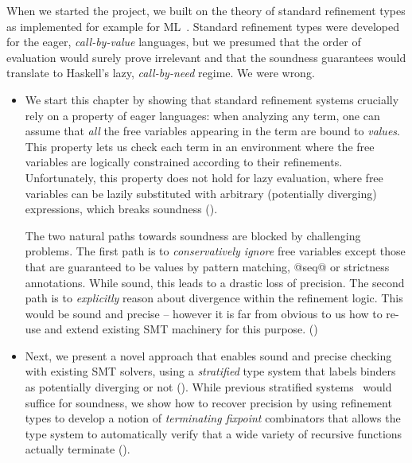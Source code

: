When we started the \toolname project, 
we built on the theory of standard refinement types 
as implemented for example for ML~\cite{pfenningxi98,GordonRefinement09,LiquidPLDI08}.
%
Standard refinement types were developed for the eager, 
\emph{call-by-value} languages, but we presumed that
the order of evaluation would surely prove irrelevant
and that the soundness guarantees would translate 
to Haskell's lazy, \emph{call-by-need} regime.
%
We were wrong.

\begin{itemize}
\item We start this chapter by showing that standard refinement 
systems crucially rely on a property of eager languages:
%
when analyzing any term, one can assume that \emph{all} the
free variables appearing in the term are bound to \emph{values}.
This property lets us check each term in an environment where 
the free variables are logically constrained according to 
their refinements.
%
Unfortunately, this property does not hold for lazy evaluation, 
where free variables can be lazily substituted with arbitrary 
(potentially diverging) expressions, which breaks 
soundness ().

The two natural paths towards soundness are blocked by challenging problems.
%
The first path is to \emph{conservatively ignore} free variables 
except those that are guaranteed to be values \eg by pattern 
matching, @seq@ or strictness annotations.  
While sound, this leads to a drastic loss of precision. 
%
The second path is to \emph{explicitly} reason about divergence 
within the refinement logic. This would be sound and 
precise -- however it is far from obvious to us how 
to re-use and extend existing SMT machinery for 
this purpose. ()


\item Next, we present a novel approach that
enables sound and precise checking with existing 
SMT solvers, using a \emph{stratified} type system that 
labels binders as potentially diverging or not 
().
%
While previous stratified systems~\cite{ConstableS87}
would suffice for soundness, we show how to recover 
precision by using refinement types to develop a 
notion of \emph{terminating fixpoint} combinators 
that allows the type system to automatically 
verify that a wide variety of recursive functions 
actually terminate ().


\end{itemize}
